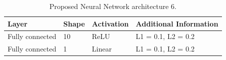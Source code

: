 \documentclass[12pt]{IEEEtran}%
\begin{document}
\begin{table}[tbh]
\centering
\begin{tabular}
[c]{llll}\hline
Layer & Shape & Activation & Additional Information\\\hline\hline
Fully connected & 10 & ReLU & L1 = 0.1, L2 = 0.2\\
Fully connected & 1 & Linear & L1 = 0.1, L2 = 0.2\\\hline
\end{tabular}
\caption{Proposed Neural Network architecture 6.}%
\label{table:proposed_nn_6}%
\end{table}
\end{document}
